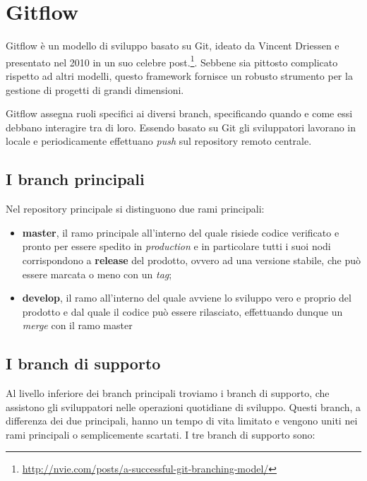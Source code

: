 \chapter{Gitflow}

Gitflow è un modello di sviluppo basato su Git, ideato da Vincent Driessen e presentato nel 2010 in un suo celebre post.\footnote{\url{http://nvie.com/posts/a-successful-git-branching-model/}}. Sebbene sia pittosto complicato rispetto ad altri modelli, questo framework fornisce un robusto strumento per la gestione di progetti di grandi dimensioni.

Gitflow assegna ruoli specifici ai diversi branch, specificando quando e come essi debbano interagire tra di loro. Essendo basato su Git gli sviluppatori lavorano in locale e periodicamente effettuano \textit{push} sul repository remoto centrale.

\section{I branch principali}

Nel repository principale si distinguono due rami principali:

\begin{itemize}

\item \textbf{master}, il ramo principale all'interno del quale risiede codice verificato e pronto per essere spedito in \textit{production} e in particolare tutti i suoi nodi corrispondono a \textbf{release} del prodotto, ovvero ad una versione stabile, che può essere marcata o meno con un \textit{tag};

\item \textbf{develop}, il ramo all'interno del quale avviene lo sviluppo vero e proprio del prodotto e dal quale il codice può essere rilasciato, effettuando dunque un \textit{merge} con il ramo master

\end{itemize}

\section{I branch di supporto}

Al livello inferiore dei branch principali troviamo i branch di supporto, che assistono gli sviluppatori nelle operazioni quotidiane di sviluppo. Questi branch, a differenza dei due principali, hanno un tempo di vita limitato e vengono uniti nei rami principali o semplicemente scartati. I tre branch di supporto sono:

